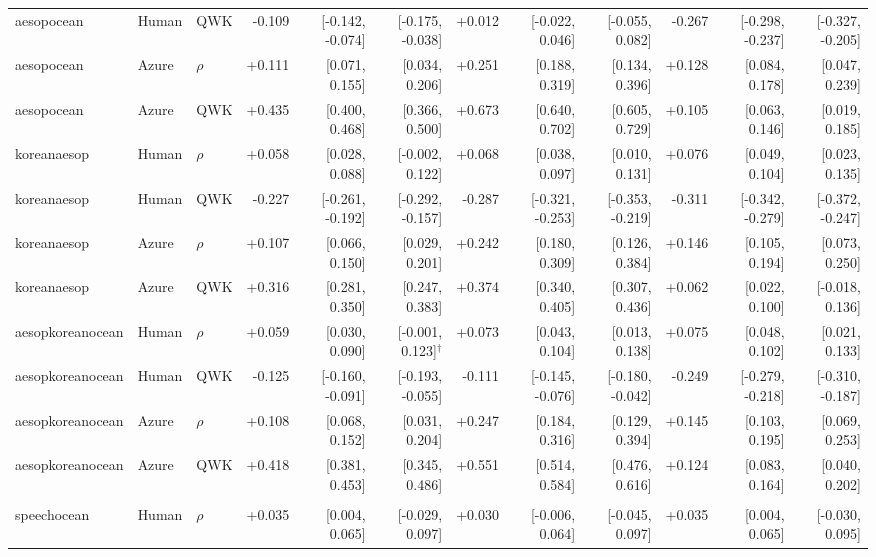 \begin{landscape}
\begin{longtable}{@{}lllrrrrrrrrr@{}}
aesopocean & Human & QWK & -0.109 & [-0.142, -0.074] & [-0.175, -0.038] & +0.012 & [-0.022, 0.046] & [-0.055, 0.082] & -0.267 & [-0.298, -0.237] & [-0.327, -0.205]\\
aesopocean & Azure & $\rho$ & +0.111 & [0.071, 0.155] & [0.034, 0.206] & +0.251 & [0.188, 0.319] & [0.134, 0.396] & +0.128 & [0.084, 0.178] & [0.047, 0.239]\\
aesopocean & Azure & QWK & +0.435 & [0.400, 0.468] & [0.366, 0.500] & +0.673 & [0.640, 0.702] & [0.605, 0.729] & +0.105 & [0.063, 0.146] & [0.019, 0.185]\\
\addlinespace[2pt]
koreanaesop & Human & $\rho$ & +0.058 & [0.028, 0.088] & [-0.002, 0.122] & +0.068 & [0.038, 0.097] & [0.010, 0.131] & +0.076 & [0.049, 0.104] & [0.023, 0.135]\\
koreanaesop & Human & QWK & -0.227 & [-0.261, -0.192] & [-0.292, -0.157] & -0.287 & [-0.321, -0.253] & [-0.353, -0.219] & -0.311 & [-0.342, -0.279] & [-0.372, -0.247]\\
koreanaesop & Azure & $\rho$ & +0.107 & [0.066, 0.150] & [0.029, 0.201] & +0.242 & [0.180, 0.309] & [0.126, 0.384] & +0.146 & [0.105, 0.194] & [0.073, 0.250]\\
koreanaesop & Azure & QWK & +0.316 & [0.281, 0.350] & [0.247, 0.383] & +0.374 & [0.340, 0.405] & [0.307, 0.436] & +0.062 & [0.022, 0.100] & [-0.018, 0.136]\\
\addlinespace[2pt]
aesopkoreanocean & Human & $\rho$ & +0.059 & [0.030, 0.090] & [-0.001, 0.123]$^{\dagger}$ & +0.073 & [0.043, 0.104] & [0.013, 0.138] & +0.075 & [0.048, 0.102] & [0.021, 0.133]\\
aesopkoreanocean & Human & QWK & -0.125 & [-0.160, -0.091] & [-0.193, -0.055] & -0.111 & [-0.145, -0.076] & [-0.180, -0.042] & -0.249 & [-0.279, -0.218] & [-0.310, -0.187]\\
aesopkoreanocean & Azure & $\rho$ & +0.108 & [0.068, 0.152] & [0.031, 0.204] & +0.247 & [0.184, 0.316] & [0.129, 0.394] & +0.145 & [0.103, 0.195] & [0.069, 0.253]\\
aesopkoreanocean & Azure & QWK & +0.418 & [0.381, 0.453] & [0.345, 0.486] & +0.551 & [0.514, 0.584] & [0.476, 0.616] & +0.124 & [0.083, 0.164] & [0.040, 0.202]\\
\addlinespace[2pt]
\midrule\multicolumn{12}{l}{\textbf{B-D: three-ratio banded, accuracy MAE}}\\*
speechocean & Human & $\rho$ & +0.035 & [0.004, 0.065] & [-0.029, 0.097] & +0.030 & [-0.006, 0.064] & [-0.045, 0.097] & +0.035 & [0.004, 0.065] & [-0.030, 0.095]\\

\end{longtable}
\end{landscape}
